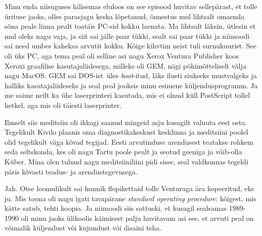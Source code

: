 Minu enda niisuguses hilisemas eluloos on see episood huvitav sellepärast, et 
tolle ürituse jaoks, olles parasjagu keska lõpetanud,  õnnestus mul lihtsalt 
omaenda sõna peale linna pealt toatäis PC-sid kokku laenata. Ma lihtsalt 
läksin, ütlesin et mul oleks nagu vaja, ja siit sai jälle paar tükki, sealt sai 
paar tükki ja niimoodi sai need umbes kaheksa arvutit kokku. Kõige kihvtim 
neist tuli surnukuurist. See oli üks PC, aga tema peal oli selline asi nagu 
Xerox Ventura Publisher koos Xeroxi graafilise kasutajaliidesega, milleks oli 
GEM, nägi põhimõtteliselt välja nagu MacOS. GEM 
sai DOS-ist üles \emph{boot}-itud,  läks ilusti siukseks mustvalgeks ja halliks 
kasutajaliideseks ja seal peal jooksis minu esimene küljendusprogramm. Ja me 
saime neilt ka ühe laserprinteri kasutada, mis ei olnud küll PostScript tollel 
hetkel, aga mis oli täiesti  laserprinter. 


Ilmselt siis meditsiin oli ikkagi saanud mingeid asju kusagilt valuuta eest 
osta. Tegelikult Kivilo plaanis oma  
diagnostikakeskust kesklinna ja meditsiini poolel olid  tegelikult  
väga kõvad tegijad. Eesti arvutinduse arendusest teatakse rohkem seda 
seltskonda, kes oli nagu Tartu poole pealt ja seotud geeniga ja võib-olla 
Küber. Mina olen tulnud  nagu meditsiiniliini pidi sisse, seal 
valdkonnas tegeldi päris kõvasti teadus- ja arendustegevusega. 


Jah. Otse loomulikult sai hunnik flopikettaid tolle Venturaga ära kopeeritud, 
eks ju. Mis toona oli nagu igati tavapärane \emph{standard operating 
procedure}:  kõigest, mis kätte satub, tehti koopia. Ja niimoodi siis sattuski, 
et kusagil sealsamas 1989-1990  oli minu jaoks ülikoolis käimisest palju 
huvitavam asi see, et arvuti peal on  võimalik küljendust või kujundust või 
disaini teha. 

